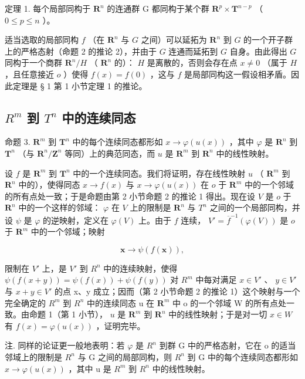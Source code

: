 定理 1. 每个局部同构于 \(\mathbf{R}^n\) 的连通群 G 都同构于某个群 \(\mathbf{R}^p \times \mathbf{T}^{n-p}\) （ \(0 \leqslant p \leqslant n\) ）。

适当选取的局部同构 \(f\) （在 \(\mathbf{R}^n\) 与 \(G\) 之间）可以延拓为 \(\mathbf{R}^n\) 到 \(G\) 的一个开子群上的严格态射（命题 2 的推论 2），并由于 \(G\) 连通而延拓到 \(G\) 自身。由此得出 \(G\) 同构于一个商群 \(\mathbf{R}^n / H\) （ \(\mathbf{R}^n\) 的）： \(H\) 是离散的，否则会存在点 \(x \neq 0\) （属于 \(H\) ，且任意接近 \(o\) ）使得 \(f(x) = f(0)\) ，这与 \(f\) 是局部同构这一假设相矛盾。因此定理是 § 1 第 1 小节定理 1 的推论。

\subsection{\texorpdfstring{\(R^{m}\) 到 \(T^{n}\) 中的连续同态}{R 的 m 次幂到 T 的 n 次幂中的连续同态}}

命题 3. \(\mathbf{R}^m\) 到 \(\mathbf{T}^n\) 中的每个连续同态都形如 \(x \to \varphi(u(x))\) ，其中 \(\varphi\) 是 \(\mathbf{R}^n\) 到 \(\mathbf{T}^n\) （与 \(\mathbf{R}^n / \mathbf{Z}^n\) 等同）上的典范同态，而 \(u\) 是 \(\mathbf{R}^m\) 到 \(\mathbf{R}^n\) 中的线性映射。

设 \(f\) 是 \(\mathbf{R}^m\) 到 \(\mathbf{T}^n\) 中的一个连续同态。我们将证明，存在线性映射 \(u\) （ \(\mathbf{R}^m\) 到 \(\mathbf{R}^n\) 中的），使得同态 \(x \to f(x)\) 与 \(x \to \varphi(u(x))\) 在 \(o\) 于 \(\mathbf{R}^m\) 中的一个邻域的所有点处一致；于是命题由第 2 小节命题 2 的推论 1 得出。现在设 \(V\) 是 \(o\) 于 \(\mathbf{R}^n\) 中的一个这样的邻域： \(\varphi\) 在 \(V\) 上的限制是 \(\mathbf{R}^n\) 与 \(T^n\) 之间的一个局部同构，并设 \(\psi\) 是 \(\varphi\) 的逆映射，定义在 \(\varphi(V)\) 上。由于 \(f\) 连续， \(V' = \overline{f}^{-1}(\varphi(V))\) 是 \(o\) 于 \(\mathbf{R}^m\) 中的一个邻域；映射

\[
\boldsymbol {x} \rightarrow \psi (f (\boldsymbol {x})),
\]

限制在 \(V'\) 上，是 \(V'\) 到 \(R^n\) 中的连续映射，使得 \(\psi(f(x+y)) = \psi(f(x)) + \psi(f(y))\) 对 \(R^m\) 中每对满足 \(x \in V'\) 、 \(y \in V'\) 与 \(x + y \in V'\) 的点 x、y 成立；因而（第 2 小节命题 2 的推论 1）这个映射与一个完全确定的 \(R^m\) 到 \(R^n\) 中的连续同态 u 在 \(\mathbf{R}^m\) 中 o 的一个邻域 W 的所有点处一致。由命题 1（第 1 小节）， \(u\) 是 \(\mathbf{R}^m\) 到 \(\mathbf{R}^n\) 中的线性映射；于是对一切 \(x \in W\) 有 \(f(x) = \varphi(u(x))\) ，证明完毕。

注. 同样的论证更一般地表明：若 \(\varphi\) 是 \(R^{n}\) 到群 G 中的严格态射，它在 o 的适当邻域上的限制是 \(R^{n}\) 与 G 之间的局部同构，则 \(R^{n}\) 到 G 中的每个连续同态都形如 \(x \to \varphi(u(x))\) ，其中 u 是 \(R^{m}\) 到 \(R^{n}\) 中的线性映射。

